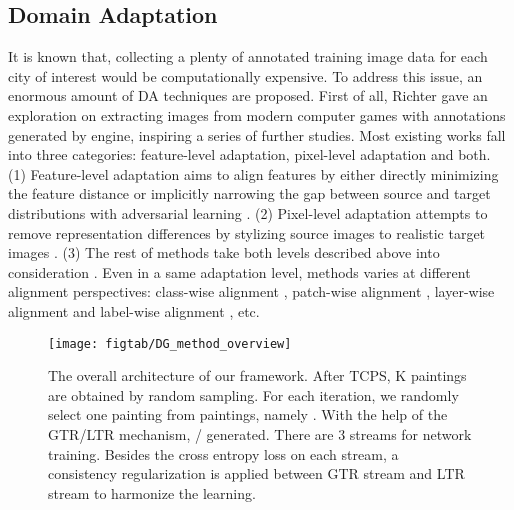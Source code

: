 \documentclass[twocolumn,journal,vlined,ruled,linesnumbered]{IEEEtran}
\begin{document}
\subsection{Domain Adaptation\label{subsec:Domain-Adaption}}

It is known that, collecting a plenty of annotated training image data for each city of interest would be computationally expensive. To address this issue, an enormous amount of DA techniques are proposed. First of all, Richter \cite{richter2016playing} gave an exploration on extracting images from modern computer games with annotations generated by engine, inspiring a series of further studies. Most existing works fall into three categories: feature-level adaptation, pixel-level adaptation and both. (1) Feature-level adaptation aims to align features by either directly minimizing the feature distance \cite{chen2018road,long2016unsupervised,ganin2014unsupervised,cariucci2017autodial} or implicitly narrowing the gap between source and target distributions with adversarial learning \cite{hoffman2016fcns,chen2017no,tsai2018learning,tzeng2017adversarial,luo2019taking,vu2019advent,tsai2019domain}. (2) Pixel-level adaptation attempts to remove representation differences by stylizing source images to realistic target images \cite{zhu2017unpaired,murez2018image,bousmalis2017unsupervised,zou2018domain}. (3) The rest of methods take both levels described above into consideration \cite{hoffman2017cycada,wu2018dcan}. Even in a same adaptation level, methods varies at different alignment perspectives: class-wise alignment \cite{chen2017no,du2019ssf,luo2019taking}, patch-wise alignment \cite{tsai2019domain}, layer-wise alignment \cite{long2016unsupervised,cariucci2017autodial} and label-wise alignment \cite{tsai2018learning,zou2018domain}, etc.

\begin{figure*}[tbh]
\begin{centering}
\texttt{[image: figtab/DG\_method\_overview]}
\par\end{centering}
\vspace{-2mm}
\caption{The overall architecture of our framework. After TCPS, K paintings are obtained by random sampling. For each iteration, we randomly select one painting from  paintings, namely . With the help of the GTR/LTR mechanism, / generated. There are 3 streams for network training. Besides the cross entropy loss on each stream, a consistency regularization is applied between GTR stream and LTR stream to harmonize the learning. \label{fig:Overview-of-the}}
\vspace{-5mm}
\end{figure*}
\end{document}
